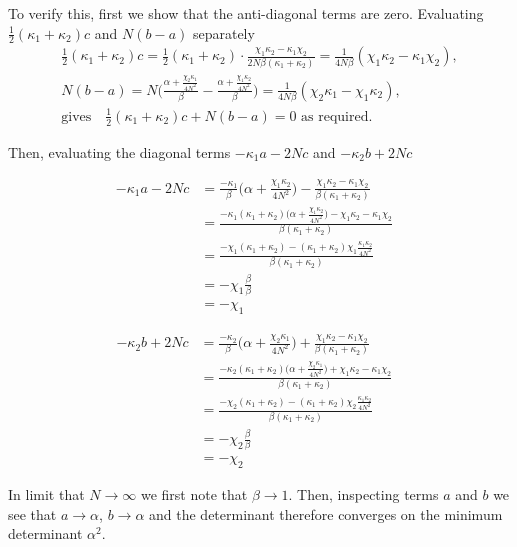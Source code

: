 \documentclass[11pt,a4paper]{article}
\numberwithin{equation}{section}
\begin{document}
	To verify this, first we show that the anti-diagonal terms are zero. Evaluating $\frac{1}{2}(\kappa_1 + \kappa_2)c$ and $N(b-a)$ separately
	\begin{align*}
	&\frac{1}{2}(\kappa_1 + \kappa_2) c = \frac{1}{2}(\kappa_1 + \kappa_2) \cdot \frac{\chi_1 \kappa_2 - \kappa_1 \chi_2}{2N\beta (\kappa_1+\kappa_2)} = \frac{1}{4N\beta}(\chi_1 \kappa_2 - \kappa_1 \chi_2),&\\
	&N(b-a)= N \Big(\frac{\alpha + \frac{\chi_2 \kappa_1}{4N^2}}{\beta} -\frac{\alpha + \frac{\chi_1 \kappa_2}{4N^2}}{\beta}\Big) = \frac{1}{4N\beta}(\chi_2 \kappa_1 - \chi_1 \kappa_2),&\\
	&\text{gives}\quad\frac{1}{2}(\kappa_1 + \kappa_2)c + N(b-a) = 0\text{ as required.}&
	\end{align*}
	
	Then, evaluating the diagonal terms $-\kappa_1 a - 2Nc$ and $-\kappa_2 b + 2Nc$
	
	\begin{align*}
	-\kappa_1 a - 2Nc &= \frac{-\kappa_1}{\beta} \Big(\alpha + \frac{\chi_1 \kappa_2}{4N^2} \Big) - \frac{\chi_1 \kappa_2 - \kappa_1 \chi_2}{\beta (\kappa_1+\kappa_2)}&\\
	&= \frac{-\kappa_1 (\kappa_1+\kappa_2) \Big(\alpha + \frac{\chi_1 \kappa_2}{4N^2} \Big) - \chi_1 \kappa_2 - \kappa_1 \chi_2}{\beta (\kappa_1+\kappa_2)}&\\
	&= \frac{-\chi_1(\kappa_1+\kappa_2)- (\kappa_1+\kappa_2)\chi_1 \frac{\kappa_1 \kappa_2}{4N^2}}{\beta (\kappa_1+\kappa_2)}&\\
	&= -\chi_1 \frac{\beta}{\beta}&\\
	&= -\chi_1&
	\end{align*}
	
	\begin{align*}
	-\kappa_2 b + 2Nc &= \frac{-\kappa_2}{\beta} \Big(\alpha + \frac{\chi_2 \kappa_1}{4N^2} \Big) + \frac{\chi_1 \kappa_2 - \kappa_1 \chi_2}{\beta (\kappa_1+\kappa_2)}&\\
	&= \frac{-\kappa_2 (\kappa_1+\kappa_2) \Big(\alpha + \frac{\chi_2 \kappa_1}{4N^2} \Big) + \chi_1 \kappa_2 - \kappa_1 \chi_2}{\beta (\kappa_1+\kappa_2)}&\\
	&= \frac{-\chi_2(\kappa_1+\kappa_2)- (\kappa_1+\kappa_2)\chi_2 \frac{\kappa_1 \kappa_2}{4N^2}}{\beta (\kappa_1+\kappa_2)}&\\
	&= -\chi_2 \frac{\beta}{\beta}&\\
	&= - \chi_2&
	\end{align*}
	

	In limit that $N \rightarrow \infty$ we first note that $\beta \rightarrow 1$. Then, inspecting terms $a$ and $b$ we see that $a \rightarrow \alpha$, $b \rightarrow \alpha$ and the determinant therefore converges on the minimum determinant $\alpha^2$.
	
\end{document}
